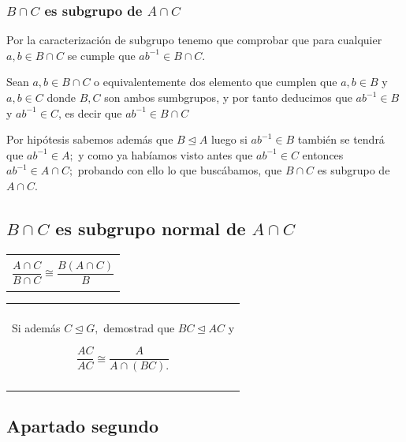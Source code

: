 \documentclass[12pt]{article}
\newenvironment{micaja}
{
    \begin{center}
    \begin{tabular}{|p{0.9\textwidth}|}
    \hline\\
    }   
    {   
    \\\\\hline
    \end{tabular} 
    \end{center}
    }
\begin{document}
\subsubsection*{$B \cap C$ es subgrupo de  $A  \cap C$ }

Por la caracterización de subgrupo
tenemo que comprobar que para cualquier $a,b \in B \cap C$ se cumple que 
$ab^{-1} \in B \cap C.$

Sean $a,b \in B \cap C$ o equivalentemente dos elemento que cumplen que
 $a,b \in B$ y $  a,b \in C$ donde $B,C$ son ambos sumbgrupos, 
 y por tanto deducimos que $ab^{-1} \in B$ y $ab^{-1} \in C$, es 
 decir que $ab^{-1} \in B \cap C$

Por hipótesis sabemos además que $B \trianglelefteq A$ luego si 
$ab^{-1} \in B$ también se tendrá que $ab^{-1} \in A;$ y como ya habíamos visto 
antes
que $ab^{-1} \in C$ entonces $ab^{-1} \in A  \cap C;$ probando con ello lo que 
buscábamos, que $B \cap C$ es subgrupo de  $A  \cap C.$


\subsection*{$B \cap C$ es subgrupo normal de  $A  \cap C$}

\begin{micaja}
\begin{equation*}
    \frac{A \cap C}{B \cap C} \cong \frac{B(A \cap C)}{B}
\end{equation*}
\end{micaja}


\begin{micaja}
    Si además $C \trianglelefteq G,$ demostrad que $BC \trianglelefteq AC$ y 

    \begin{equation*}
        \frac{AC}{AC} \cong \frac{A}{A \cap (BC).}
    \end{equation*}
\end{micaja}
    

\subsection{Apartado segundo}
\end{document}
